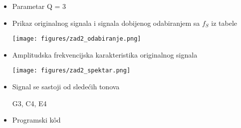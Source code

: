 
\begin{itemize}
    \item Parametar Q = 3
    \item Prikaz originalnog signala i signala dobijenog odabiranjem sa $f_S$ iz tabele
        \begin{center}
            \texttt{[image: figures/zad2\_odabiranje.png]}
        \end{center}
        
    \item Amplitudska frekvencijska karakteristika originalnog signala
        \begin{center}
            \texttt{[image: figures/zad2\_spektar.png]}
        \end{center}
        
    \item Signal se sastoji od sledećih tonova
    \begin{center}
        G3, C4, E4
    \end{center}
        
    \item Programski k\^{o}d 
    
\end{itemize}

